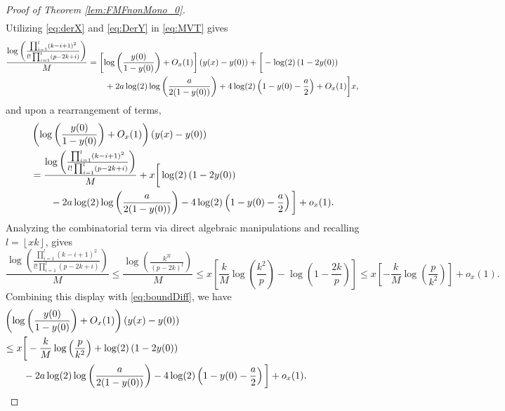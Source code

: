\documentclass[12pt,reqno]{amsart}
\numberwithin{equation}{section}
\theoremstyle{definition}
\newcommand{\floor}[1]{\left\lfloor #1 \right\rfloor}
\renewcommand{\[}{\begin{equation}}
\renewcommand{\]}{\end{equation}}
\renewcommand{\|}{\bigg{|}}
\begin{document}
\begin{proof}[Proof of Theorem \ref{lem:FMFnonMono_0}]
\begin{align}
    \end{align}
    Utilizing \eqref{eq:derX} and \eqref{eq:DerY} in \eqref{eq:MVT} gives
    \begin{align}
         \frac{\log\left(\frac{\prod_{i=1}^{l}(k-i+1)^2}{l!\prod_{i=1}^l(p-2k+i)}\right)}{M} &= \left[\log\left(\frac{y(0)}{1-y(0)}\right) + O_x(1)\right] (y(x) - y(0)) + \bigg{[}-\log(2)\left(1-2y(0)\right) \\
         &\qquad + 2a\log(2) \log\left(\frac{a}{2(1-y(0))}\right) + 4\log(2)\left(1 - y(0) - \frac{a}{2}\right) + O_x(1)\bigg{]}x,
    \end{align}
    and upon a rearrangement of terms,
    \[\label{eq:boundDiff}\begin{split}
        \hspace{-1cm}&\left(\log\left( \frac{y(0)}{1-y(0)}\right) + O_x(1) \right)(y(x) - y(0))\\ &= \frac{\log\left(\frac{\prod_{i=1}^{l}(k-i+1)^2}{l!\prod_{i=1}^l(p-2k+i)}\right)}{M} + x\bigg{[}\log(2)\left(1-2y(0)\right) \\
        &\qquad - 2a\log(2) \log\left(\frac{a}{2(1-y(0))}\right) - 4\log(2)\left(1 - y(0) - \frac{a}{2}\right)\bigg{]} + o_x(1).
    \end{split}\]
    Analyzing the combinatorial term via direct algebraic manipulations and recalling $l = \floor{xk}$, gives
    \[\frac{\log\left(\frac{\prod_{i=1}^{l}(k-i+1)^2}{l!\prod_{i=1}^l(p-2k+i)}\right)}{M} \leq \frac{\log\left(\frac{k^{2l}}{(p-2k)^l}\right)}{M} \leq x\left[\frac{k}{M}\log\left(\frac{k^2}{p}\right) - \log\left(1-\frac{2k}{p}\right)\right] \leq x\left[-\frac{k}{M}\log\left(\frac{p}{k^2}\right)\right] + o_x(1).
    \]
    Combining this display with \eqref{eq:boundDiff}, we have
    \[\label{eq:preDerEquation}\hspace{-2cm}\begin{split}
    &\left(\log\left( \frac{y(0)}{1-y(0)}\right) + O_x(1) \right)(y(x) - y(0)) \\ 
    &\leq x\bigg{[}-\frac{k}{M}\log\left(\frac{p}{k^2}\right) + \log(2)\left(1-2y(0)\right) \\
        &\qquad- 2a\log(2) \log\left(\frac{a}{2(1-y(0))}\right)  - 4\log(2)\left(1 - y(0) - \frac{a}{2}\right)\bigg{]} + o_x(1).
    \end{split}\]


\end{proof}
\end{document}
